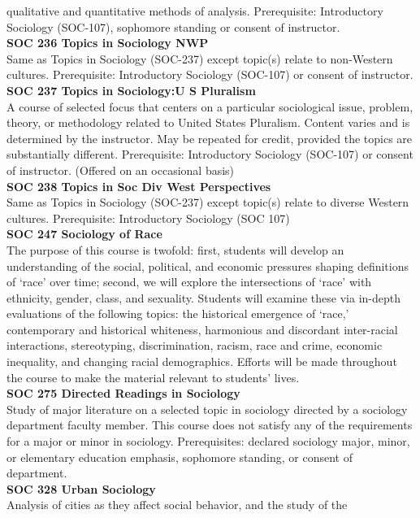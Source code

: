 \documentclass[
  letterpaper,
]{scrbook}
\begin{document}
qualitative and quantitative methods of analysis. Prerequisite:
Introductory Sociology (SOC-107), sophomore standing or consent of
instructor.\\
\textbf{SOC 236 Topics in Sociology NWP}\\
Same as Topics in Sociology (SOC-237) except topic(s) relate to
non-Western cultures. Prerequisite: Introductory Sociology (SOC-107) or
consent of instructor.\\
\textbf{SOC 237 Topics in Sociology:U S Pluralism}\\
A course of selected focus that centers on a particular sociological
issue, problem, theory, or methodology related to United States
Pluralism. Content varies and is determined by the instructor. May be
repeated for credit, provided the topics are substantially different.
Prerequisite: Introductory Sociology (SOC-107) or consent of instructor.
(Offered on an occasional basis)\\
\textbf{SOC 238 Topics in Soc Div West Perspectives}\\
Same as Topics in Sociology (SOC-237) except topic(s) relate to diverse
Western cultures. Prerequisite: Introductory Sociology (SOC 107)\\
\textbf{SOC 247 Sociology of Race}\\
The purpose of this course is twofold: first, students will develop an
understanding of the social, political, and economic pressures shaping
definitions of `race' over time; second, we will explore the
intersections of `race' with ethnicity, gender, class, and sexuality.
Students will examine these via in-depth evaluations of the following
topics: the historical emergence of `race,' contemporary and historical
whiteness, harmonious and discordant inter-racial interactions,
stereotyping, discrimination, racism, race and crime, economic
inequality, and changing racial demographics. Efforts will be made
throughout the course to make the material relevant to students'
lives.\\
\textbf{SOC 275 Directed Readings in Sociology}\\
Study of major literature on a selected topic in sociology directed by a
sociology department faculty member. This course does not satisfy any of
the requirements for a major or minor in sociology. Prerequisites:
declared sociology major, minor, or elementary education emphasis,
sophomore standing, or consent of department.\\
\textbf{SOC 328 Urban Sociology}\\
Analysis of cities as they affect social behavior, and the study of the
\end{document}

